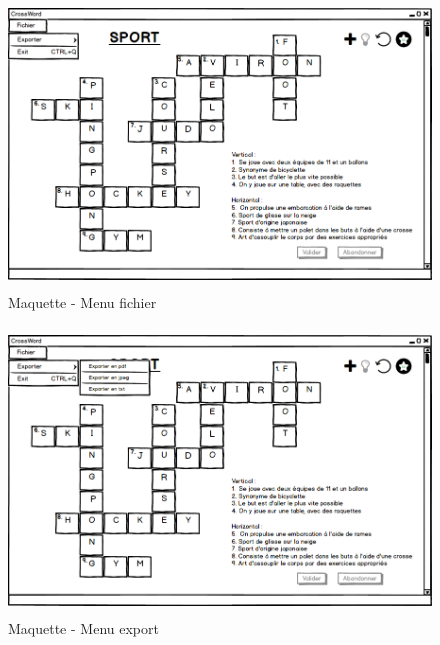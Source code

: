 \documentclass [ 11 pt ] {article}
\begin{document}
   \begin{figure}[H]
    \begin{center}
        \includegraphics[height=3in]{Maquettes/Grille_solution_file.png}
        \caption{Maquette - Menu fichier} 
    \end{center}
    \end{figure}
    
   \begin{figure}[H]
    \begin{center}
        \includegraphics[height=3in]{Maquettes/Grille_solution_export.png}
        \caption{Maquette - Menu export} 
    \end{center}
    \end{figure}
\end{document}
